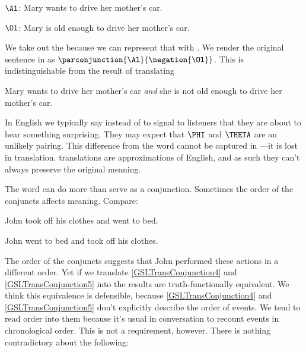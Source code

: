 \begin{description}[itemsep=0em]
	\item[Translation Key:] \hfill{} 
	\begin{description}[itemsep=0em]
		\item $\Al$: Mary wants to drive her mother's car.
		\item $\Ol$: Mary is old enough to drive her mother's car.
	\end{description} 
\end{description}

\noindent{}We take out the  because we can represent that with \mention{$\NEGATION$}.
We render the original sentence in \GSL{} as $\parconjunction{\Al}{\negation{\Ol}}$.
This is indistinguishable from the result of translating

\begin{menumerate}
	\item Mary wants to drive her mother's car \emph{and} she is not old enough to drive her mother's car.
\end{menumerate}

\noindent{}In English we typically say  instead of  to signal to listeners that they are about to hear something surprising.
They may expect that $\PHI$ and $\THETA$ are an unlikely pairing.
This difference from the word  cannot be captured in \GSL{}---it is lost in translation.
\GSL{} translations are approximations of English, and as such they can't always preserve the original meaning.

The word  can do more than serve as a conjunction.
Sometimes the order of the conjuncts affects meaning.
Compare:

\begin{menumerate}
	\item\label{GSLTransConjunction4} John took off his clothes and went to bed.
\end{menumerate}
\begin{menumerate}
	\item\label{GSLTransConjunction5} John went to bed and took off his clothes.
\end{menumerate}

The order of the conjuncts suggests that John performed these actions in a different order.
Yet if we translate \ref{GSLTransConjunction4} and \ref{GSLTransConjunction5} into \GSL{} the results are truth-functionally equivalent.
We think this equivalence is defensible, because \ref{GSLTransConjunction4} and \ref{GSLTransConjunction5} don't explicitly describe the order of events.
We tend to read order into them because it's usual in conversation to recount events in chronological order.
This is not a requirement, however.
There is nothing contradictory about the following:

